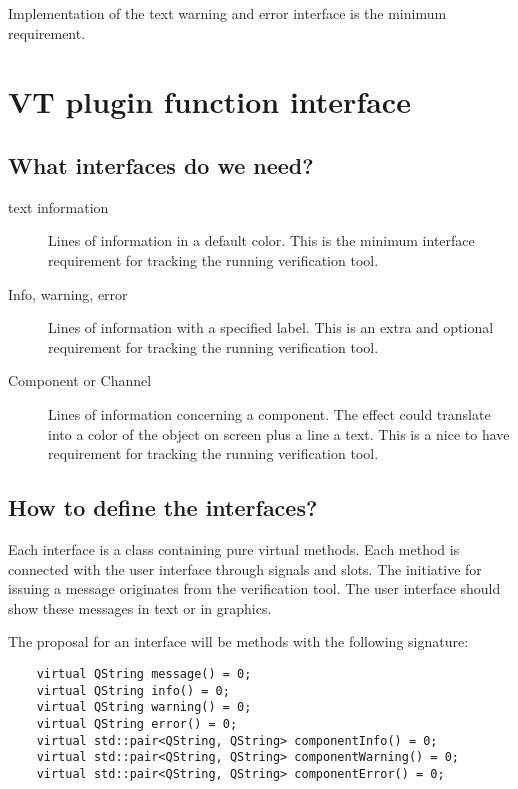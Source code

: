 \documentclass[a4paper,11pt,final]{article}
\begin{document}
Implementation of the text warning and error interface is the minimum
requirement. 

\section{VT plugin function interface}

\subsection{What interfaces do we need?}

\begin{description}
	\item[text information]	Lines of information in a default color. This is the
	minimum interface requirement for tracking the running verification tool.

	\item[Info, warning, error]	Lines of information with a specified label. This is an
	extra and optional requirement for tracking the running verification tool.

	\item[Component or Channel] Lines of information concerning a component. The effect could
	translate into a color of the object on screen plus a line a text. This is a nice to have
	requirement for tracking the running verification tool.

\end{description}

\subsection{How to define the interfaces?}

Each interface is a class containing pure virtual methods. Each method is connected with
the user interface through signals and slots. The initiative for issuing a message originates
from the verification tool. The user interface should show these messages in text or in graphics.

The proposal for an interface will be methods with the following signature:

\begin{verbatim}
	virtual QString message() = 0;
	virtual QString info() = 0;
	virtual QString warning() = 0;
	virtual QString error() = 0;
	virtual std::pair<QString, QString> componentInfo() = 0;
	virtual std::pair<QString, QString> componentWarning() = 0;
	virtual std::pair<QString, QString> componentError() = 0;
\end{verbatim}
\end{document}

